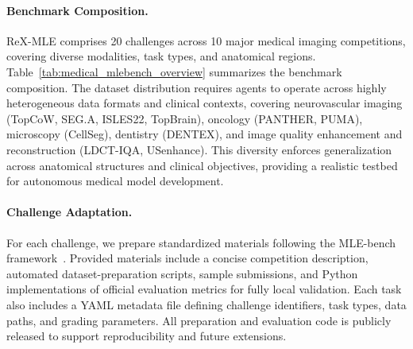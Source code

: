 \documentclass{midl} %
\begin{document}
\paragraph{Benchmark Composition.}
ReX-MLE comprises 20 challenges across 10 major medical imaging competitions, covering diverse modalities, task types, and anatomical regions. Table~\ref{tab:medical_mlebench_overview} summarizes the benchmark composition.
The dataset distribution requires agents to operate across highly heterogeneous data formats and clinical contexts, covering neurovascular imaging (TopCoW, SEG.A, ISLES22, TopBrain), oncology (PANTHER, PUMA), microscopy (CellSeg), dentistry (DENTEX), and image quality enhancement and reconstruction (LDCT-IQA, USenhance). This diversity enforces generalization across anatomical structures and clinical objectives, providing a realistic testbed for autonomous medical model development.


\paragraph{Challenge Adaptation.}
For each challenge, we prepare standardized materials following the MLE-bench framework~\citep{chan2024mle}. Provided materials include a concise competition description, automated dataset-preparation scripts, sample submissions, and Python implementations of official evaluation metrics for fully local validation. Each task also includes a YAML metadata file defining challenge identifiers, task types, data paths, and grading parameters. All preparation and evaluation code is publicly released to support reproducibility and future extensions.
\end{document}
